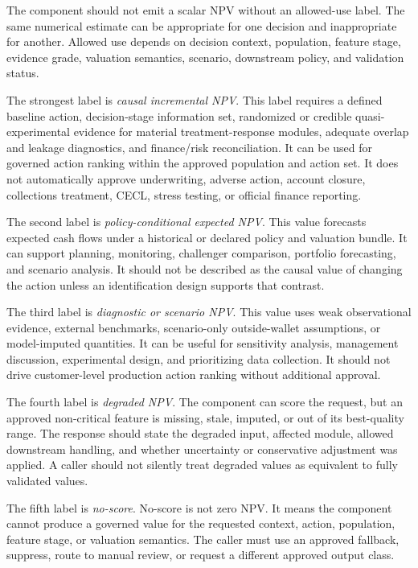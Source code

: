 \documentclass[11pt]{article}
\newcommand{\1}{\mathbf{1}}
\begin{document}
The component should not emit a scalar NPV without an allowed-use label. The
same numerical estimate can be appropriate for one decision and inappropriate
for another. Allowed use depends on decision context, population, feature
stage, evidence grade, valuation semantics, scenario, downstream policy, and
validation status.

The strongest label is \emph{causal incremental NPV}. This label requires a
defined baseline action, decision-stage information set, randomized or credible
quasi-experimental evidence for material treatment-response modules, adequate
overlap and leakage diagnostics, and finance/risk reconciliation. It can be
used for governed action ranking within the approved population and action
set. It does not automatically approve underwriting, adverse action, account
closure, collections treatment, CECL, stress testing, or official finance
reporting.

The second label is \emph{policy-conditional expected NPV}. This value
forecasts expected cash flows under a historical or declared policy and
valuation bundle. It can support planning, monitoring, challenger comparison,
portfolio forecasting, and scenario analysis. It should not be described as
the causal value of changing the action unless an identification design
supports that contrast.

The third label is \emph{diagnostic or scenario NPV}. This value uses weak
observational evidence, external benchmarks, scenario-only outside-wallet
assumptions, or model-imputed quantities. It can be useful for sensitivity
analysis, management discussion, experimental design, and prioritizing data
collection. It should not drive customer-level production action ranking
without additional approval.

The fourth label is \emph{degraded NPV}. The component can score the request,
but an approved non-critical feature is missing, stale, imputed, or out of its
best-quality range. The response should state the degraded input, affected
module, allowed downstream handling, and whether uncertainty or conservative
adjustment was applied. A caller should not silently treat degraded values as
equivalent to fully validated values.

The fifth label is \emph{no-score}. No-score is not zero NPV. It means the
component cannot produce a governed value for the requested context, action,
population, feature stage, or valuation semantics. The caller must use an
approved fallback, suppress, route to manual review, or request a different
approved output class.
\end{document}
